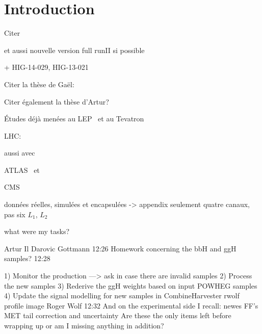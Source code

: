 \section{Introduction}\label{chapter-HTT_analysis-section-introduction}

Citer 

et aussi nouvelle version full runII si possible

+ HIG-14-029, HIG-13-021


Citer la thèse de Gaël:\\

Citer également la thèse d'Artur?\\


Études déjà menées au LEP~\cite{Schael:2006cr} et au Tevatron~\cite{Aaltonen:2009vf,Abazov:2011jh}

LHC: \cite{CMS-PAS-HIG-13-021,CMS-PAS-HIG-14-029,CMS-PAS-HIG-17-020}

aussi avec \quarkb\antiquarkb~\cite{Chatrchyan:2013qga,Khachatryan:2015tra}

ATLAS \mu\mu\ et \tau\tau~\cite{Aad:2012cfr,ATLAS-MSSM-HTT_2018,ATLAS-MSSM-HTT_2020}

CMS \mu\mu~\cite{CMS:2015ooa} \tau\tau~\cite{Chatrchyan:2012vp,CMS-MSSM-HTT_2014,CMS-PAS-HIG-17-020}


données réelles, simulées et encapsulées  -> appendix
seulement quatre canaux, pas six
$L_1$, $L_2$

what were my tasks?

	
Artur Il Darovic Gottmann
12:26
Homework concerning the bbH and ggH samples?
12:28




1) Monitor the production ---> ask in case there are invalid samples
2) Process the new samples
3) Rederive the ggH weights based on input POWHEG samples
4) Update the signal modelling for new samples in CombineHarvester
rwolf profile image	
Roger Wolf
12:32
And on the experimental side I recall:
newes FF's
MET tail correction and uncertainty
Are these the only items left before wrapping up or am I missing anything in addition?